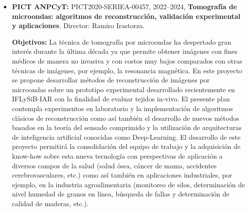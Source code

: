 \documentclass[a4paper,11pt,twoside,final,titlepage,onecolumn,openright]{report}
\begin{document}
\begin{itemize}
{\bf Logros:} se avanzó en el modelo de torso completo inspirado en geometrías humanas donde se demostró que la influencia de la ubicación del electrodo pasivo no tiene significancia clínica si se observa el tamaño de lesión producida en el tratamiento de arritmia cardíaca ventricular, se publicó un trabajo en revista internacional. Por otro lado, también publicamos en revista internacional en la temática relacionada con termocoagulación desarrollando un modelo computacional para predecir el tamaño de lesión en cerebro (zona epileptógena) para cierto tipo de electrodos. Adicionalmente, en la temática de biomecánica, notamos que el PMMA es un producto que se obtiene mediante una reacción exotérmica, la cual podría ocurrir dentro del paciente, este efecto es conocido por los médicos pero no había sido estudiado en esta aplicación. Por consiguiente se diseñó un equipo para adquirir temperaturas  durante la fragua de PMMA en contacto con el tejido. Esto lo presentamos en la Jornada de Becarios de la UTN y estamos trabajando en un manuscrito para enviar a una revista.

 {\bf Dificultades:} no se produjeron dificultades en el desarrollo del proyecto.

\item \textbf{PICT ANPCyT:} PICT2020-SERIEA-00457, 2022--2024, {\bf Tomografía de microondas: algoritmos de reconstrucción, validación experimental y aplicaciones}. Director: Ramiro Irastorza.

    \textbf{Objetivos:} La técnica de tomografía por microondas ha despertado gran interés durante la última década ya que permite obtener imágenes con fines médicos de manera no invasiva y con costos muy bajos comparados con otras técnicas de imágenes, por ejemplo, la resonancia magnética. En este proyecto se propone desarrollar métodos de reconstrucción de imágenes por microondas sobre un prototipo experimental desarrollado recientemente en IFLySiB-IAR con la finalidad de evaluar tejidos in-vivo. El presente plan contempla experimentos en laboratorio y la implementación de algoritmos clásicos de reconstrucción como así también el desarrollo de nuevos métodos basados en la teoría del sensado comprimido y la utilización de arquitecturas de inteligencia artificial conocidas como Deep-Learning. El desarrollo de este proyecto permitirá la consolidación del equipo de trabajo y la adquisición de know-how sobre esta nueva tecnología con perspectivas de aplicación a diversos campos de la salud (salud ósea, cáncer de mama, accidentes cerebrovasculares, etc.) como así también en aplicaciones industriales, por ejemplo, en la industria agroalimentaria (monitoreo de silos, determinación de nivel humedad de granos en línea, búsqueda de fallas y determinación de calidad de maderas, etc.).


\end{itemize}
\end{document}
